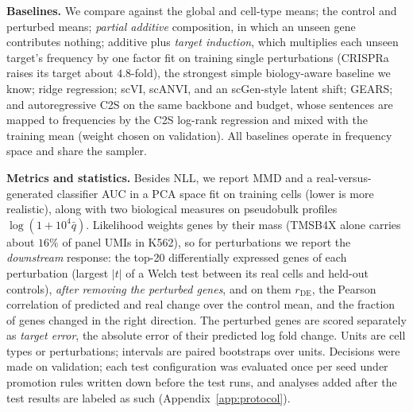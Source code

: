 \documentclass[10pt]{article}
\makeatletter
\renewcommand\section{\@startsection{section}{1}{\z@}{-3.5ex \@plus -1ex \@minus -.2ex}{2.3ex \@plus.2ex}{\normalfont\Large\bfseries\raggedright\hyphenpenalty=10000}}
\makeatother
\begin{document}
\textbf{Baselines.} We compare against the global and cell-type means; the control and perturbed means; \emph{partial additive} composition, in which an unseen gene contributes nothing; additive plus \emph{target induction}, which multiplies each unseen target's frequency by one factor fit on training single perturbations (CRISPRa raises its target about $4.8$-fold), the strongest simple biology-aware baseline we know; ridge regression; scVI, scANVI, and an scGen-style latent shift; GEARS; and autoregressive C2S on the same backbone and budget, whose sentences are mapped to frequencies by the C2S log-rank regression and mixed with the training mean (weight chosen on validation). All baselines operate in frequency space and share the sampler.

\textbf{Metrics and statistics.} Besides NLL, we report MMD and a real-versus-generated classifier AUC in a PCA space fit on training cells (lower is more realistic), along with two biological measures on pseudobulk profiles $\log(1+10^4\bar q)$. Likelihood weights genes by their mass (TMSB4X alone carries about $16\%$ of panel UMIs in K562), so for perturbations we report the \emph{downstream} response: the top-20 differentially expressed genes of each perturbation (largest $|t|$ of a Welch test between its real cells and held-out controls), \emph{after removing the perturbed genes}, and on them $r_{\mathrm{DE}}$, the Pearson correlation of predicted and real change over the control mean, and the fraction of genes changed in the right direction. The perturbed genes are scored separately as \emph{target error}, the absolute error of their predicted log fold change. Units are cell types or perturbations; intervals are paired bootstraps over units. Decisions were made on validation; each test configuration was evaluated once per seed under promotion rules written down before the test runs, and analyses added after the test results are labeled as such (Appendix~\ref{app:protocol}).

\section{Results}\label{sec:results}
\end{document}
